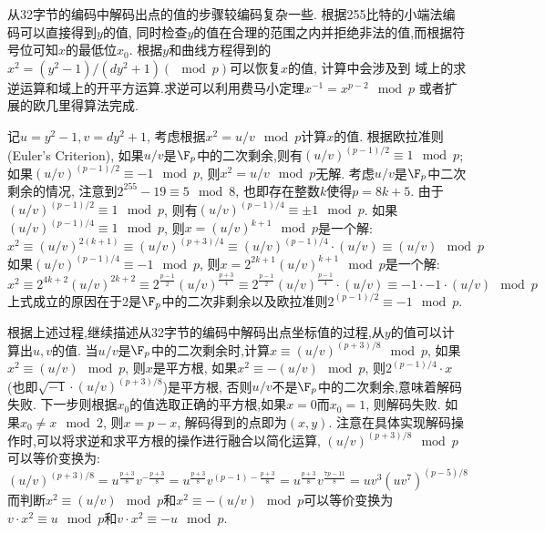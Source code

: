 从32字节的编码中解码出点的值的步骤较编码复杂一些. 根据255比特的小端法编码可以直接得到$y$的值,
同时检查$y$的值在合理的范围之内并拒绝非法的值,而根据符号位可知$x$的最低位$x_0$.
根据$y$和曲线方程得到的$x^2 = (y^2-1) / (dy^2 + 1) (\mod p)$可以恢复$x$的值, 计算中会涉及到
域上的求逆运算和域上的开平方运算.求逆可以利用费马小定理$x^{-1} = x^{p-2} \mod p$
或者扩展的欧几里得算法完成.

记$u = y^2-1, v = dy^2 + 1$, 考虑根据$x^2 = u/v \mod p$计算$x$的值.
根据欧拉准则(Euler's Criterion),
如果$u/v$是$\F_p$中的二次剩余,则有$(u/v)^{(p-1)/2} \equiv 1 \mod p$;
如果$(u/v)^{(p-1)/2} \equiv -1 \mod p$, 则$x^2 = u/v \mod p$无解.
考虑$u/v$是$\F_p$中二次剩余的情况, 
注意到$2^{255}-19 \equiv 5 \mod 8$, 也即存在整数$k$使得$p = 8k + 5$.
由于$(u/v)^{(p-1)/2} \equiv 1 \mod p$, 则有$(u/v)^{(p-1)/4} \equiv \pm 1 \mod p$.
如果$(u/v)^{(p-1)/4} \equiv 1 \mod p$, 则$x = (u/v)^{k+1}\mod p$是一个解:
$$
x^2 \equiv (u/v)^{2(k+1)} \equiv (u/v)^{(p+3)/4} \equiv (u/v)^{(p-1)/4}\cdot (u/v) \equiv (u/v) \mod p 
$$
如果$(u/v)^{(p-1)/4} \equiv -1 \mod p$, 则$x = 2^{2k+1}(u/v)^{k+1}\mod p$是一个解:
$$
x^2 \equiv 2^{4k+2}(u/v)^{2k+2} \equiv 2^{\frac{p-1}{2}}(u/v)^{\frac{p+3}{4}} \equiv
 2^{\frac{p-1}{2}} (u/v)^{\frac{p-1}{4}}\cdot (u/v) \equiv -1 \cdot -1 \cdot (u/v) \mod p
$$
上式成立的原因在于2是$\F_p$中的二次非剩余以及欧拉准则$2^{(p-1)/2}\equiv -1 \mod p$.

根据上述过程,继续描述从32字节的编码中解码出点坐标值的过程,从$y$的值可以计算出$u, v$的值.
当$u/v$是$\F_p$中的二次剩余时,计算$x \equiv (u/v)^{(p+3)/8}\mod p$,
如果$x^2 \equiv (u/v) \mod p$, 则$x$是平方根,
如果$x^2 \equiv -(u/v)\mod p$, 则$2^{(p-1)/4} \cdot x$ (也即$\sqrt{-1}\cdot (u/v)^{(p+3)/8}$)是平方根,
否则$u/v$不是$\F_p$中的二次剩余,意味着解码失败.
下一步则根据$x_0$的值选取正确的平方根,如果$x = 0$而$x_0 = 1$, 则解码失败.
如果$x_0 \neq x \mod 2$, 则$x = p-x$, 解码得到的点即为$(x,y)$.
注意在具体实现解码操作时,可以将求逆和求平方根的操作进行融合以简化运算,
$(u/v)^{(p+3)/8}\mod p$可以等价变换为:
$$
(u/v)^{(p+3)/8} = u^{\frac{p+3}{8}} v^{-\frac{p+3}{8}}
= u^{\frac{p+3}{8}} v^{(p-1)-\frac{p+3}{8}}
= u^{\frac{p+3}{8}} v^{\frac{7p-11}{8}}
= uv^3(uv^7)^{(p-5)/8} 
$$
而判断$x^2\equiv (u/v) \mod p$和$x^2 \equiv -(u/v) \mod p$可以等价变换为
$v \cdot x^2 \equiv u \mod p$和$v \cdot x^2 \equiv -u \mod p$.

